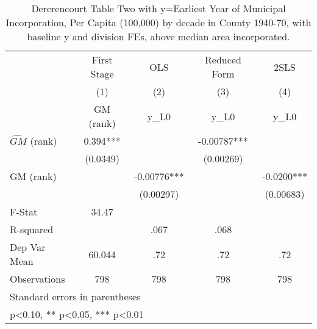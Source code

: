 \begin{table}[htbp]\centering
\def\sym#1{\ifmmode^{#1}\else\(^{#1}\)\fi}
\caption{Dererencourt Table Two with y=Earliest Year of Municipal Incorporation, Per Capita (100,000) by decade in County 1940-70, with baseline y and division FEs, above median area incorporated.}
\begin{tabular}{l*{4}{c}}
\toprule
                    & First Stage   &         OLS   &Reduced Form   &        2SLS   \\
                    &\multicolumn{1}{c}{(1)}&\multicolumn{1}{c}{(2)}&\multicolumn{1}{c}{(3)}&\multicolumn{1}{c}{(4)}\\
                    &\multicolumn{1}{c}{GM  (rank)}&\multicolumn{1}{c}{y\_L0}&\multicolumn{1}{c}{y\_L0}&\multicolumn{1}{c}{y\_L0}\\
\midrule
$\hat{GM}$ (rank)   &       0.394***&               &    -0.00787***&               \\
                    &    (0.0349)   &               &   (0.00269)   &               \\
\addlinespace
GM  (rank)          &               &    -0.00776***&               &     -0.0200***\\
                    &               &   (0.00297)   &               &   (0.00683)   \\
\midrule
F-Stat              &       34.47   &               &               &               \\
R-squared           &               &        .067   &        .068   &               \\
Dep Var Mean        &      60.044   &         .72   &         .72   &         .72   \\
Observations        &         798   &         798   &         798   &         798   \\
\bottomrule
\multicolumn{5}{l}{\footnotesize Standard errors in parentheses}\\
\multicolumn{5}{l}{\footnotesize * p<0.10, ** p<0.05, *** p<0.01}\\
\end{tabular}
\end{table}
